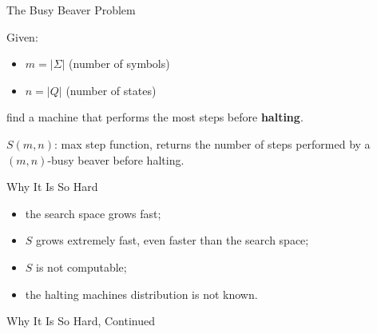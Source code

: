 \documentclass{beamer}
\begin{document}
\begin{frame}{The Busy Beaver Problem}


Given:
\begin{itemize}
\item $m = |\Sigma|$ (number of symbols)
\item $n=|Q|$ (number of states) 
\end{itemize}
find a machine that performs the most steps before \textbf{halting}.

\vspace{1cm}
$S(m,n)$: max step function, returns the number of steps performed by a $(m,n)$-busy beaver before halting.


\end{frame}

\begin{frame}{Why It Is So Hard}

  \begin{itemize}
  \item the search space grows fast;
  \item $S$ grows extremely fast, even faster than the search space;
  \item $S$ is not computable;
  \item the halting machines distribution is not known.
  \end{itemize}
\end{frame}

\begin{frame}{Why It Is So Hard, Continued}


\end{frame}
\end{document}
